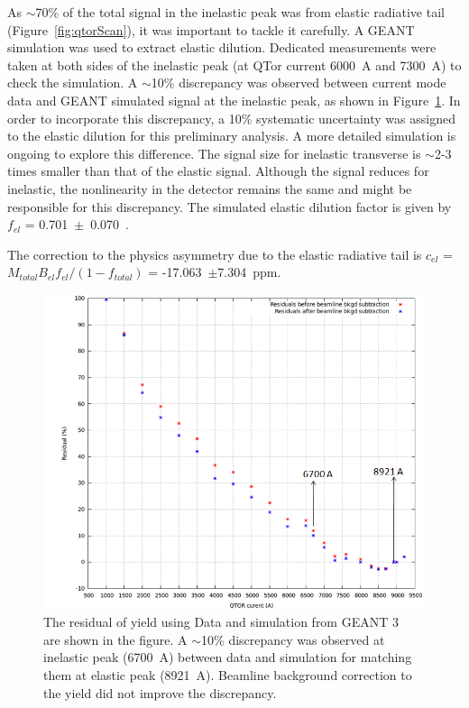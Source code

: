 As $\sim$70\% of the total signal in the inelastic peak was from elastic radiative tail (Figure~\ref{fig:qtorScan}), it was important to tackle it carefully. 
A GEANT simulation was used to extract elastic dilution. Dedicated measurements were taken at both sides of the inelastic peak (at QTor current 6000~A and 7300~A) to check the simulation. A $\sim$10\% discrepancy was observed between current mode data and GEANT simulated signal at the inelastic peak, as shown in Figure~\ref{fig:elasticDilutionDiscrepancy}. In order to incorporate this discrepancy, a 10\% systematic uncertainty was assigned to the elastic dilution for this preliminary analysis. A more detailed simulation is ongoing to explore this difference. The signal size for inelastic transverse is $\sim$2-3 times smaller than that of the elastic signal. Although the signal reduces for inelastic, the nonlinearity in the detector remains the same and might be responsible for this discrepancy.
The simulated elastic dilution factor is given by $f_{el}$ = 0.701~$\pm$~0.070~\cite{elog:adesh_analysis837, elog:nur_ancillary59}. 

The correction to the physics asymmetry due to the elastic radiative tail is $c_{el}$ = $M_{total}B_{el}f_{el}/(1-f_{total})$ = -17.063~$\pm$7.304~ppm.


\begin{figure}[!h]
	\begin{center}
	\includegraphics[width=15.0cm]{figures/elasticDilutionDiscrepancy}
	\end{center}
	\caption
	{The residual of yield using Data and simulation from GEANT 3~\cite{elog:adesh_analysis837} are shown in the figure. A $\sim$10\% discrepancy was observed at inelastic peak (6700~A) between data and simulation for matching them at elastic peak (8921~A). Beamline background correction to the yield did not improve the discrepancy. }
	\label{fig:elasticDilutionDiscrepancy}
\end{figure}

